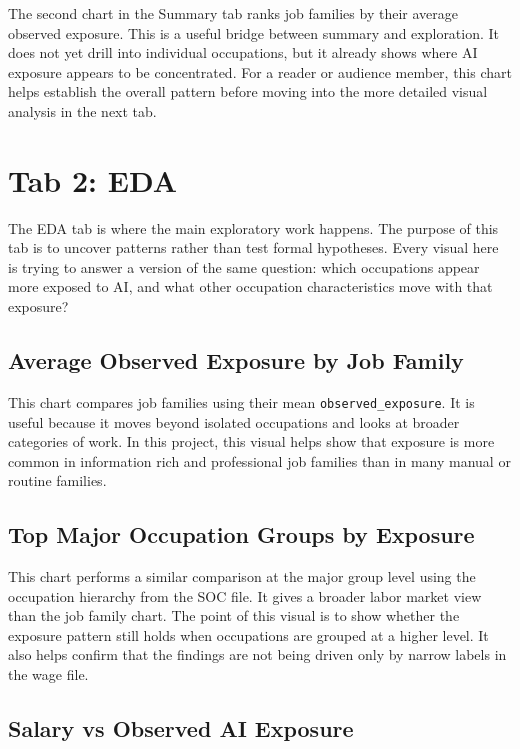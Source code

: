\documentclass[11pt]{article}
\begin{document}
The second chart in the Summary tab ranks job families by their average observed exposure. This is a useful bridge between summary and exploration. It does not yet drill into individual occupations, but it already shows where AI exposure appears to be concentrated. For a reader or audience member, this chart helps establish the overall pattern before moving into the more detailed visual analysis in the next tab.

\section*{Tab 2: EDA}

The EDA tab is where the main exploratory work happens. The purpose of this tab is to uncover patterns rather than test formal hypotheses. Every visual here is trying to answer a version of the same question: which occupations appear more exposed to AI, and what other occupation characteristics move with that exposure?

\subsection*{Average Observed Exposure by Job Family}

This chart compares job families using their mean \texttt{observed\_exposure}. It is useful because it moves beyond isolated occupations and looks at broader categories of work. In this project, this visual helps show that exposure is more common in information rich and professional job families than in many manual or routine families.

\subsection*{Top Major Occupation Groups by Exposure}

This chart performs a similar comparison at the major group level using the occupation hierarchy from the SOC file. It gives a broader labor market view than the job family chart. The point of this visual is to show whether the exposure pattern still holds when occupations are grouped at a higher level. It also helps confirm that the findings are not being driven only by narrow labels in the wage file.

\subsection*{Salary vs Observed AI Exposure}
\end{document}
